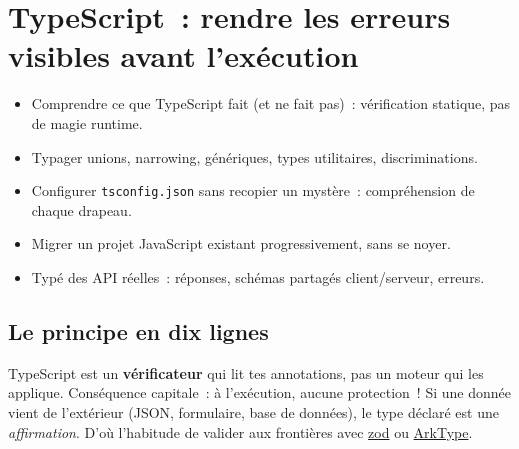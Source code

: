 \documentclass[12pt,a4paper,twoside,openright]{book}
\newcommand{\link}[2]{\href{#2}{#1}}
\begin{document}
\chapter{TypeScript~: rendre les erreurs visibles avant l'ex\'ecution}
\label{ch-js-ts}

\begin{objectif}
\begin{itemize}
  \item Comprendre ce que TypeScript fait (et ne fait pas)~: v\'erification statique, pas de magie runtime.
  \item Typager unions, narrowing, g\'en\'eriques, types utilitaires, discriminations.
  \item Configurer \texttt{tsconfig.json} sans recopier un myst\`ere~: compr\'ehension de chaque drapeau.
  \item Migrer un projet JavaScript existant progressivement, sans se noyer.
  \item Typ\'e des API r\'eelles~: r\'eponses, sch\'emas partag\'es client/serveur, erreurs.
\end{itemize}
\end{objectif}

\section{Le principe en dix lignes}


TypeScript est un \textbf{v\'erificateur} qui lit tes annotations, pas un moteur qui les applique.
Cons\'equence capitale~: \`a l'ex\'ecution, aucune protection~! Si une donn\'ee vient de l'ext\'erieur
(JSON, formulaire, base de donn\'ees), le type d\'eclar\'e est une \emph{affirmation}. D'o\`u l'habitude
de valider aux fronti\`eres avec \link{zod}{https://zod.dev/} ou \link{ArkType}{https://arktype.io/}.
\end{document}

